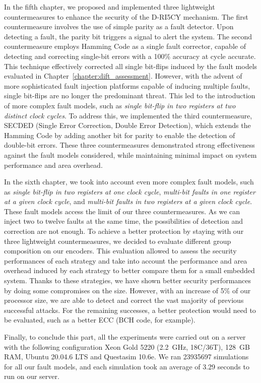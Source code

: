 In the fifth chapter, we proposed and implemented three lightweight countermeasures to enhance the security of the D-RI5CY mechanism. The first countermeasure involves the use of simple parity as a fault detector. Upon detecting a fault, the parity bit triggers a signal to alert the system. The second countermeasure employs Hamming Code as a single fault corrector, capable of detecting and correcting single-bit errors with a 100\% accuracy at cycle accurate. This technique effectively corrected all single bit-flips induced by the fault models evaluated in Chapter~\ref{chapter:dift_assessment}. However, with the advent of more sophisticated fault injection platforms capable of inducing multiple faults, single bit-flips are no longer the predominant threat. This led to the introduction of more complex fault models, such as \textit{single bit-flip in two registers at two distinct clock cycles}. To address this, we implemented the third countermeasure, SECDED (Single Error Correction, Double Error Detection), which extends the Hamming Code by adding another bit for parity to enable the detection of double-bit errors. These three countermeasures demonstrated strong effectiveness against the fault models considered, while maintaining minimal impact on system performance and area overhead.

In the sixth chapter, we took into account even more complex fault models, such as \textit{single bit-flip in two registers at one clock cycle}, \textit{multi-bit faults in one register at a given clock cycle}, and \textit{multi-bit faults in two registers at a given clock cycle}. These fault models access the limit of our three countermeasures. As we can inject two to twelve faults at the same time, the possibilities of detection and correction are not enough. To achieve a better protection by staying with our three lightweight countermeasures, we decided to evaluate different group composition on our encoders. This evaluation allowed to assess the security performances of each strategy and take into account the performance and area overhead induced by each strategy to better compare them for a small embedded system. Thanks to these strategies, we have shown better security performances by doing some compromises on the size. However, with an increase of 5\% of our processor size, we are able to detect and correct the vast majority of previous successful attacks. For the remaining successes, a better protection would need to be evaluated, such as a better ECC (BCH code, for example).

Finally, to conclude this part, all the experiments were carried out on a server with the following configuration Xeon Gold 5220 (2.2~GHz, 18C/36T), 128~GB RAM, Ubuntu 20.04.6 LTS and Questasim 10.6e. We ran \num{23935697} simulations for all our fault models, and each simulation took an average of 3.29 seconds to run on our server.

